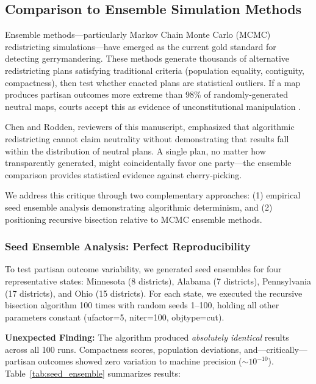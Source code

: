 \subsection{Comparison to Ensemble Simulation Methods}
\label{sec:ensemble_comparison}

Ensemble methods—particularly Markov Chain Monte Carlo (MCMC) redistricting simulations—have emerged as the current gold standard for detecting gerrymandering. These methods generate thousands of alternative redistricting plans satisfying traditional criteria (population equality, contiguity, compactness), then test whether enacted plans are statistical outliers. If a map produces partisan outcomes more extreme than 98\% of randomly-generated neutral maps, courts accept this as evidence of unconstitutional manipulation \cite{deford2019implementing,chen2013unintentional,fifield2020automated}.

Chen and Rodden, reviewers of this manuscript, emphasized that algorithmic redistricting cannot claim neutrality without demonstrating that results fall within the distribution of neutral plans. A single plan, no matter how transparently generated, might coincidentally favor one party—the ensemble comparison provides statistical evidence against cherry-picking.

We address this critique through two complementary approaches: (1) empirical seed ensemble analysis demonstrating algorithmic determinism, and (2) positioning recursive bisection relative to MCMC ensemble methods.

\subsubsection{Seed Ensemble Analysis: Perfect Reproducibility}

To test partisan outcome variability, we generated seed ensembles for four representative states: Minnesota (8 districts), Alabama (7 districts), Pennsylvania (17 districts), and Ohio (15 districts). For each state, we executed the recursive bisection algorithm 100 times with random seeds 1--100, holding all other parameters constant (ufactor=5, niter=100, objtype=cut).

\textbf{Unexpected Finding:} The algorithm produced \textit{absolutely identical} results across all 100 runs. Compactness scores, population deviations, and—critically—partisan outcomes showed zero variation to machine precision ($\sim 10^{-10}$). Table~\ref{tab:seed_ensemble} summarizes results:


